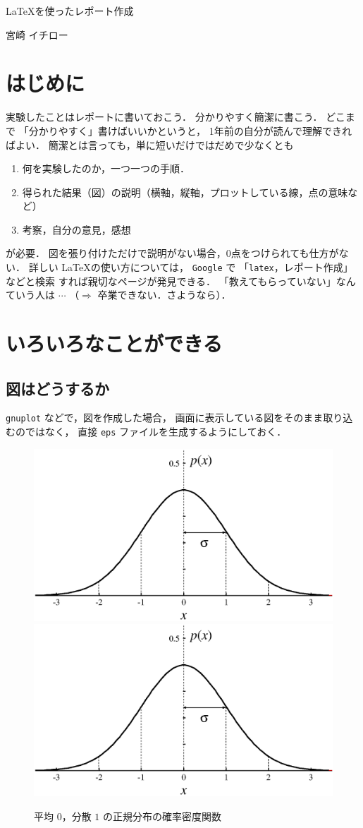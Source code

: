\documentclass[a4paper,11pt]{jarticle}
\begin{document}


\centerline{\Large\gt \LaTeX を使ったレポート作成}      
\vskip 5mm
\centerline{\Large{} 宮崎 イチロー}


\section{はじめに} 
実験したことはレポートに書いておこう．
分かりやすく簡潔に書こう．
どこまで
「分かりやすく」書けばいいかというと，
1年前の自分が読んで理解できればよい．
簡潔とは言っても，単に短いだけではだめで少なくとも
\begin{enumerate}
\item 何を実験したのか，一つ一つの手順．
\item 得られた結果（図）の説明（横軸，縦軸，プロットしている線，点の意味など）
\item 考察，自分の意見，感想
\end{enumerate}
が必要．
図を張り付けただけで説明がない場合，0点をつけられても仕方がない．
%
%
詳しい \LaTeX の使い方については，
{\tt Google} で 「{\tt latex}，レポート作成」などと検索
すれば親切なページが発見できる．
「教えてもらっていない」なんていう人は $\cdots$
（$\Longrightarrow$ 卒業できない．さようなら）．


\section{いろいろなことができる}
\subsection{図はどうするか}
{\tt gnuplot} などで，図を作成した場合，
画面に表示している図をそのまま取り込むのではなく，
直接 {\tt eps} ファイルを生成するようにしておく．
\begin{figure}[h]
\begin{center}
\includegraphics[width=.4\linewidth]{gauss001.eps}
\hspace*{2mm}
\includegraphics[width=.4\linewidth]{gauss001.eps}
\caption{平均 $0$，分散 $1$ の正規分布の確率密度関数}
\end{center}
\end{figure}
\end{document}
